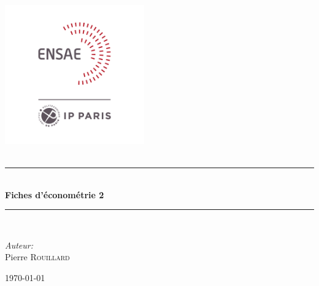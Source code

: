 \newcommand{\HRule}{\rule{\linewidth}{0.5mm}}

\begin{titlepage}
\begin{center}

\includegraphics[width=0.45\textwidth]{Core/logo.png}~\\[1cm]


\textsc{\Large }\\[0.5cm]

\begin{center}

\HRule \\[1cm]
{\huge \bfseries{Fiches d'économétrie 2}}\\[0.5cm]
\HRule \\[2.5cm]

\end{center}


\begin{minipage}{0.4\textwidth}
\begin{flushleft} \large
\emph{Auteur:}\\
Pierre \textsc{Rouillard}\\


\end{flushleft}
\end{minipage}
\begin{minipage}{0.4\textwidth}
\begin{flushright} \large
\end{flushright}
\end{minipage}

\vfill

{\large \today}

\end{center}
\end{titlepage}